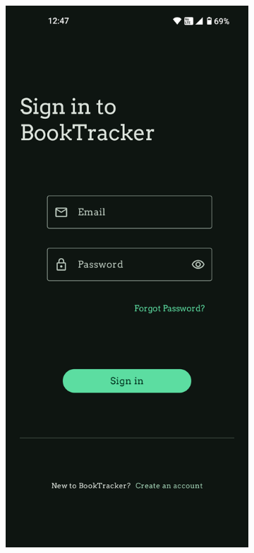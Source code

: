 \documentclass[12pt,twoside]{article}
\begin{document}
\begin{figure}[ht]
    \centering
    \begin{subfigure}[b]{0.48\textwidth}
        \includegraphics[width=\textwidth]{figures/SignIn.png}

\end{subfigure}
\end{figure}
\end{document}

